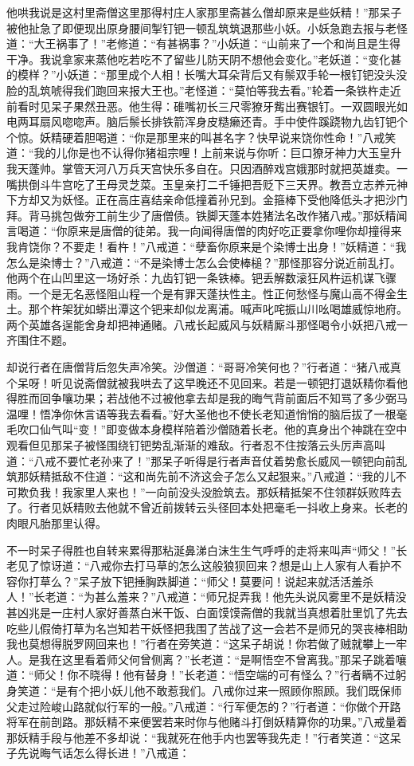\documentclass[12pt,UTF8]{ctexbook}
\begin{document}
{	他哄我说是这村里斋僧这里那得村庄人家那里斋甚么僧却原来是些妖精！”那呆子被他扯急了即便现出原身腰间掣钉钯一顿乱筑筑退那些小妖。小妖急跑去报与老怪道：“大王祸事了！”老修道：“有甚祸事？”小妖道：“山前来了一个和尚且是生得干净。我说拿家来蒸他吃若吃不了留些儿防天阴不想他会变化。”老妖道：“变化甚的模样？”小妖道：“那里成个人相！长嘴大耳朵背后又有鬃双手轮一根钉钯没头没脸的乱筑唬得我们跑回来报大王也。”老怪道：“莫怕等我去看。”轮着一条铁杵走近前看时见呆子果然丑恶。他生得：碓嘴初长三尺零獠牙觜出赛银钉。一双圆眼光如电两耳扇风唿唿声。脑后鬃长排铁箭浑身皮糙癞还青。手中使件蹊跷物九齿钉钯个个惊。妖精硬着胆喝道：“你是那里来的叫甚名字？快早说来饶你性命！”八戒笑道：“我的儿你是也不认得你猪祖宗哩！上前来说与你听：巨口獠牙神力大玉皇升我天蓬帅。掌管天河八万兵天宫快乐多自在。只因酒醉戏宫娥那时就把英雄卖。一嘴拱倒斗牛宫吃了王母灵芝菜。玉皇亲打二千锤把吾贬下三天界。教吾立志养元神下方却又为妖怪。正在高庄喜结亲命低撞着孙兄到。金箍棒下受他降低头才把沙门拜。背马挑包做夯工前生少了唐僧债。铁脚天蓬本姓猪法名改作猪八戒。”那妖精闻言喝道：“你原来是唐僧的徒弟。我一向闻得唐僧的肉好吃正要拿你哩你却撞得来我肯饶你？不要走！看杵！”八戒道：“孽畜你原来是个染博士出身！”妖精道：“我怎么是染博士？”八戒道：“不是染博士怎么会使棒槌？”那怪那容分说近前乱打。他两个在山凹里这一场好杀：九齿钉钯一条铁棒。钯丢解数滚狂风杵运机谋飞骤雨。一个是无名恶怪阻山程一个是有罪天蓬扶性主。性正何愁怪与魔山高不得金生土。那个杵架犹如蟒出潭这个钯来却似龙离浦。喊声叱咤振山川吆喝雄威惊地府。两个英雄各逞能舍身却把神通赌。八戒长起威风与妖精厮斗那怪喝令小妖把八戒一齐围住不题。
	
	却说行者在唐僧背后忽失声冷笑。沙僧道：“哥哥冷笑何也？”行者道：“猪八戒真个呆呀！听见说斋僧就被我哄去了这早晚还不见回来。若是一顿钯打退妖精你看他得胜而回争嚷功果；若战他不过被他拿去却是我的晦气背前面后不知骂了多少弼马温哩！悟净你休言语等我去看看。”好大圣他也不使长老知道悄悄的脑后拔了一根毫毛吹口仙气叫“变！”即变做本身模样陪着沙僧随着长老。他的真身出个神跳在空中观看但见那呆子被怪围绕钉钯势乱渐渐的难敌。行者忍不住按落云头厉声高叫道：“八戒不要忙老孙来了！”那呆子听得是行者声音仗着势愈长威风一顿钯向前乱筑那妖精抵敌不住道：“这和尚先前不济这会子怎么又起狠来。”八戒道：“我的儿不可欺负我！我家里人来也！”一向前没头没脸筑去。那妖精抵架不住领群妖败阵去了。行者见妖精败去他就不曾近前拨转云头径回本处把毫毛一抖收上身来。长老的肉眼凡胎那里认得。
	
	不一时呆子得胜也自转来累得那粘涎鼻涕白沫生生气呼呼的走将来叫声“师父！”长老见了惊讶道：“八戒你去打马草的怎么这般狼狈回来？想是山上人家有人看护不容你打草么？”呆子放下钯捶胸跌脚道：“师父！莫要问！说起来就活活羞杀人！”长老道：“为甚么羞来？”八戒道：“师兄捉弄我！他先头说风雾里不是妖精没甚凶兆是一庄村人家好善蒸白米干饭、白面馍馍斋僧的我就当真想着肚里饥了先去吃些儿假倚打草为名岂知若干妖怪把我围了苦战了这一会若不是师兄的哭丧棒相助我也莫想得脱罗网回来也！”行者在旁笑道：“这呆子胡说！你若做了贼就攀上一牢人。是我在这里看着师父何曾侧离？”长老道：“是啊悟空不曾离我。”那呆子跳着嚷道：“师父！你不晓得！他有替身！”长老道：“悟空端的可有怪么？”行者瞒不过躬身笑道：“是有个把小妖儿他不敢惹我们。八戒你过来一照顾你照顾。我们既保师父走过险峻山路就似行军的一般。”八戒道：“行军便怎的？”行者道：“你做个开路将军在前剖路。那妖精不来便罢若来时你与他赌斗打倒妖精算你的功果。”八戒量着那妖精手段与他差不多却说：“我就死在他手内也罢等我先走！”行者笑道：“这呆子先说晦气话怎么得长进！”八戒道：
	
}
\end{document}
